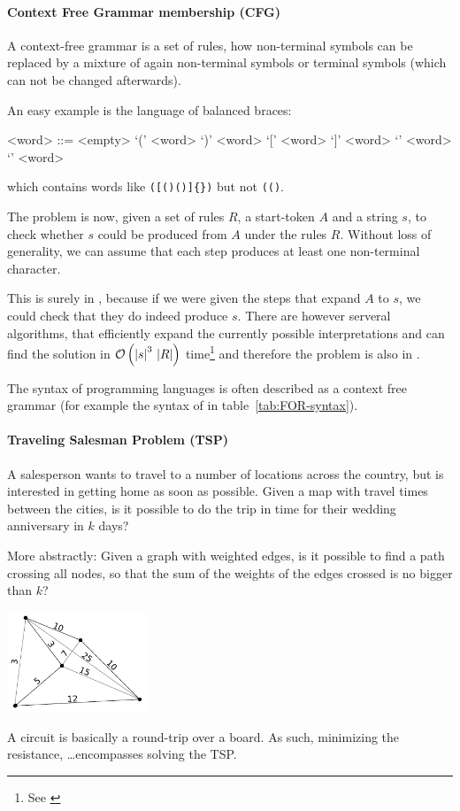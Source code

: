 \paragraph{Context Free Grammar membership (CFG)}
A context-free grammar is a set of rules, how non-terminal symbols can be replaced by 
a mixture of again non-terminal symbols or terminal symbols (which can not be 
changed afterwards).

An easy example is the language of balanced braces:

\begin{grammar}
	<word> ::= <empty>
						\alt `(' <word> `)' <word>
						\alt `[' <word> `]' <word>
						\alt `{' <word> `}' <word>
\end{grammar}
which contains words like \texttt{([()()]\{\})} but not \texttt{(()}.

The problem is now, given a set of rules $R$, a start-token $A$ and a string 
$s$, to check whether $s$ could be produced from $A$ under the rules $R$. 
Without loss of generality, we can assume that each step produces at least 
one non-terminal character\citationneeded.

This is surely in \NPTIME, because if we were given the steps that expand $A$ 
to $s$, we could check that they do indeed produce $s$. There are however 
serveral algorithms, that efficiently expand the currently possible 
interpretations and can find the solution in
$\mathcal{O}\left( \left|s\right|^3\,\left|R\right| \right)$ time\footnote{See 
	\cite{sipser2006introduction}} and therefore the problem is also in \PTIME.
\begin{example}[Relevance]
	The syntax of programming languages is often
	described as a context free grammar (for example
	the syntax of \FOR in table~\ref{tab:FOR-syntax}).
\end{example}

\paragraph{Traveling Salesman Problem (TSP)}
A salesperson wants to travel to a number of locations across the country, 
but is interested in getting home as soon as possible. Given a map with 
travel times between the cities, is it possible to do the trip in time for 
their wedding anniversary in $k$ days?

More abstractly: Given a graph with weighted edges, is it possible to find a 
path crossing all nodes, so that the sum of the weights of the edges crossed 
is no bigger than $k$?
\begin{center}
	\includegraphics[height=3cm]{complexity/langcomplexity/pictures/tsp}
\end{center}
\begin{example}[Relevance]
	A circuit is basically a round-trip over a board. As such, minimizing 
	the resistance, \dots encompasses solving the TSP.
\end{example}

